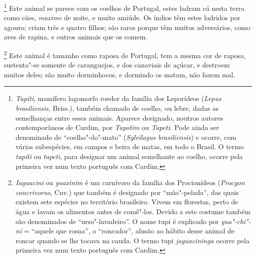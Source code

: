 \begin{linenumbers}
\footnote{ \textit{Tapiti}, mamífero lagomorfo
roedor da família dos Leporídeos (\textit{Lepus brasiliensis}, Briss.), 
também chamado de coelho, ou lebre, dadas as semelhanças
entre esses animais. Aparece designado, noutros autores contemporâneos
de Cardim, por \textit{Tapotim} ou \textit{Tapeti.} Pode ainda ser
denominado de ``coelho"-do"-mato'' (\textit{Sylvilagus brasiliensis}) e
ocorre, com várias subespécies, em campos e beira de matas, em todo o
Brasil. O termo \textit{tapiti} ou \textit{tapeti}, para designar um
animal semelhante ao coelho, ocorre pela primeira vez num
texto português com Cardim.} Este animal se parece com os
coelhos de Portugal, estes ladram cá nesta terra como cães,
\textit{maxime} de noite, e muito amiúde. Os índios têm estes ladridos
por agouro; criam três e quatro filhos; são raros porque têm muitos
adversários, como aves de rapina, e outros animais que os comem.

\footnote{ \textit{Iaguacini} ou
\textit{guaxinim} é um carnívoro da família dos Procionídeos 
(\textit{Procyon cancrivorus}, Cuv.) que também é designado por
``mão"-pelada'', das quais existem sete espécies no território
brasileiro. Vivem em florestas, perto de água e lavam os alimentos
antes de comê"-los. Devido a este costume também são denominados de ``urso"-lavadeiro''. 
O nome tupi é explicado por \textit{gua"-chi"-ni} = ``aquele que rosna'', 
o ``roncador'', alusão ao hábito desse animal de
roncar quando se lhe tocava na cauda. O termo tupi \textit{jaguacininga}
ocorre pela primeira vez num texto português com Cardim.} Este animal 
é tamanho como raposa de Portugal, tem a mesma cor de
raposa, sustenta"-se somente de caranguejos, e dos canaviais de açúcar,
e destroem muitos deles; são muito dorminhocos, e dormindo os matam,
não fazem mal. 


\end{linenumbers}
